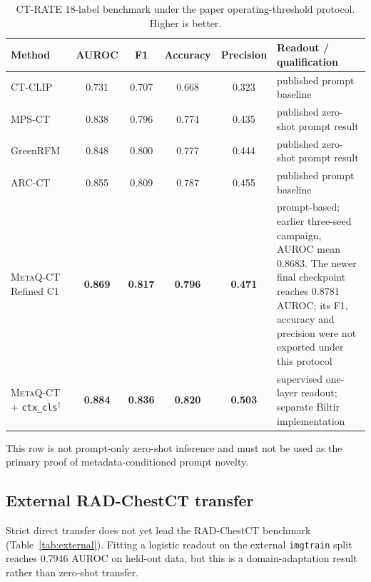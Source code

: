 \documentclass[10pt,twocolumn]{article}
\newcommand{\ours}{\textsc{MetaQ-CT}}
\newcommand{\best}[1]{\textbf{#1}}
\begin{document}
\begin{table}[t]
\centering
\begin{threeparttable}
\caption{CT-RATE 18-label benchmark under the paper operating-threshold
protocol. Higher is better.}
\label{tab:adultbench}
\begin{tabular}{@{}lccccp{4.5cm}@{}}
\toprule
Method & AUROC & F1 & Accuracy & Precision & Readout / qualification \\
\midrule
CT-CLIP~\cite{hamamci2024ctclip} & 0.731 & 0.707 & 0.668 & 0.323 & published prompt baseline \\
MPS-CT~\cite{li2025mpsct} & 0.838 & 0.796 & 0.774 & 0.435 & published zero-shot prompt result \\
GreenRFM~\cite{li2026greenrfm} & 0.848 & 0.800 & 0.777 & 0.444 & published zero-shot prompt result \\
ARC-CT~\cite{isik2026arcct} & 0.855 & 0.809 & 0.787 & 0.455 & published prompt baseline \\
\ours{} Refined C1 & \best{0.869} & \best{0.817} & \best{0.796} & \best{0.471} & prompt-based; earlier three-seed campaign, AUROC mean 0.8683. The newer final checkpoint reaches 0.8781 AUROC; its F1, accuracy and precision were not exported under this protocol \\
\ours{} + \texttt{ctx\_cls}$^{\dagger}$ & \best{0.884} & \best{0.836} & \best{0.820} & \best{0.503} & supervised one-layer readout; separate Biltir implementation \\
\bottomrule
\end{tabular}
\begin{tablenotes}[flushleft]\footnotesize
\item[$\dagger$] This row is not prompt-only zero-shot inference and must not
be used as the primary proof of metadata-conditioned prompt novelty.
\end{tablenotes}
\end{threeparttable}
\end{table}

\subsection{External RAD-ChestCT transfer}
Strict direct transfer does not yet lead the RAD-ChestCT benchmark
(Table~\ref{tab:external}). Fitting a logistic readout on the external
\texttt{imgtrain} split reaches 0.7946 AUROC on held-out data, but this is a
domain-adaptation result rather than zero-shot transfer.
\end{document}
